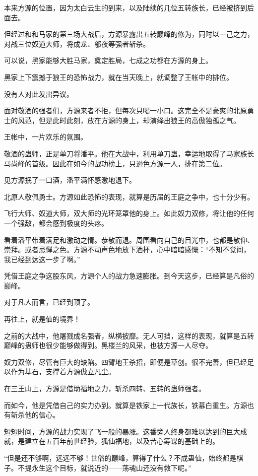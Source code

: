 \begin{this_body}
本来方源的位置，因为太白云生的到来，以及陆续的几位五转族长，已经被挤到后面去。

但经过和和马家的第三场大战后，方源暴露出五转巅峰的修为，同时以一己之力，对战三位奴道大师，将成龙、邬夜等强者斩杀。

可以说，黑家能够大胜马家，奠定胜局，七成之功都在方源的身上。

黑家上下震撼于狼王的恐怖战力，就在当天晚上，就调整了王帐中的排位。

没有人对此发出异议。

面对敬酒的强者们，方源来者不拒，但每次只喝一小口。这完全不是豪爽的北原勇士的风范，但是此时此刻，放在方源的身上，却演绎出狼王的高傲独孤之气。

王帐中，一片欢乐的氛围。

敬酒的蛊师，正是单刀将潘平。他在大战中，利用单刀蛊，幸运地取得了马家族长马尚峰的首级。因此在如今的战功榜上，只逊色方源一人，排在第二位。

见方源抿了一口酒，潘平满怀感激地退下。

北原人敬佩勇士。方源如此恐怖的表现，就算是历届的王庭之争中，也十分少有。

飞行大师、奴道大师，双大师的光环笼罩他的身上。如此奴力双修，将让他的任何一个强敌，都会感到极度的头疼。

看着潘平带着满足和激动之情。恭敬而退。周围看向自己的目光中，也都是敬仰、崇拜。或者忌惮之色。方源不动声色地放下酒杯，心中暗暗感慨：“不知不觉间，我已经到达这一步了啊。”

凭借王庭之争这股东风，方源个人的战力急速膨胀。到今天这步，已经算是凡俗的巅峰。

对于凡人而言，已经到顶了。

再往上，就是仙的境界！

之前的大战中，他屠戮成名强者，纵横披靡。无人可挡，这样的表现，就算是五转巅峰的蛊师也很少能够做得到。黑楼兰的风采，也被方源一人尽夺。

奴力双修，尽管有巨大的缺陷。四臂地王杀招，即便是草创。很不完善，但已经足以作为基石，支撑着方源傲立凡尘。

在三王山上，方源是借助福地之力，斩杀四转、五转的蛊师强者。

而如今，他是凭借自己的实力办到。就算是铁家上一代族长，铁慕白重生。方源也有斩杀他的信心。

短短时间，方源的战力实现了飞一般的暴涨。这番旁人终身都难以达到的巨大成就，是建立在五百年前世经验，狐仙福地，以及苦心筹谋的基础上的。

“但是还不够啊，远远不够！世俗的巅峰，算得了什么？不成蛊仙，始终都是棋子。不提永生这个目标，就说近的——荡魂山还没有救下呢。”


\end{this_body}

